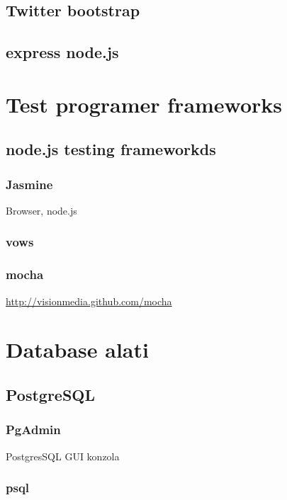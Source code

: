 \documentclass[times, utf8, seminar]{fit}
\begin{document}
\section{Twitter bootstrap}

\section{express node.js}

\chapter{Test programer frameworks}

\section{node.js testing frameworkds}

\subsection{Jasmine}

Browser, node.js

\subsection{vows}

\subsection{mocha}

\url{http://visionmedia.github.com/mocha}


\chapter{Database alati}

\section{PostgreSQL}

\subsection{PgAdmin}

PostgresSQL GUI konzola

\subsection{psql}
\end{document}
